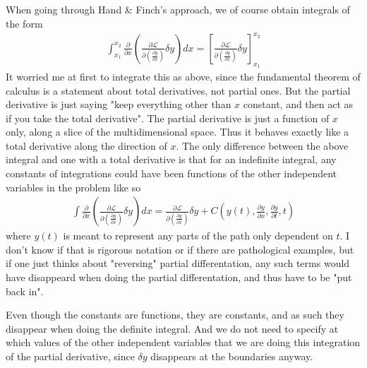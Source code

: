 \documentclass[a4paper]{article}
\begin{document}
    When going through Hand \& Finch's approach, we of course obtain integrals of the form \begin{align*}
        \int_{x_1}^{x_2} \frac{\partial}{\partial x} \left( \frac{\partial \mathcal{L} }{\partial \left( \frac{\partial y}{\partial x}  \right) } \delta y \right)  dx = \left[ \frac{\partial \mathcal{L} }{\partial \left( \frac{\partial y}{\partial x}  \right) } \delta y \right]_{x_1}^{x_2}
    \end{align*}
    It worried me at first to integrate this as above, since the fundamental theorem of calculus is a statement about total derivatives, not partial ones. But the partial derivative is just saying "keep everything other than \(x\) constant, and then act as if you take the total derivative". The partial derivative is just a function of \(x\) only, along a slice of the multidimensional space. Thus it behaves exactly like a total derivative along the direction of \(x\). The only difference between the above integral and one with a total derivative is that for an indefinite integral, any constants of integrations could have been functions of the other independent variables in the problem like so \begin{align*}
        \int \frac{\partial}{\partial x} \left( \frac{\partial \mathcal{L} }{\partial \left( \frac{\partial y}{\partial x}  \right) } \delta y \right)  dx = \frac{\partial \mathcal{L} }{\partial \left( \frac{\partial y}{\partial x}  \right) } \delta y + C\left(y(t), \frac{\partial y}{\partial x}, \frac{\partial y}{\partial t}, t\right)
    \end{align*}
    where \(y(t)\) is meant to represent any parts of the path only dependent on \(t\). I don't know if that is rigorous notation or if there are pathological examples, but if one just thinks about "reversing" partial differentation, any such terms would have disappeard when doing the partial differentation, and thus have to be "put back in". 

    Even though the constants are functions, they are constants, and as such they disappear when doing the definite integral. And we do not need to specify at which values of the other independent variables that we are doing this integration of the partial derivative, since \(\delta y\) disappears at the boundaries anyway.
\end{document}
